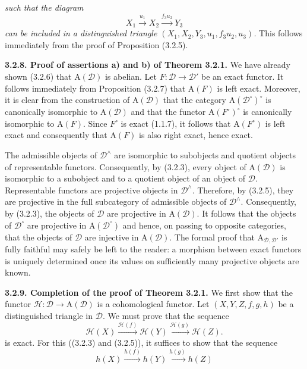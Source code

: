 \clearpage
{}%
\begingroup\small\setlength{\parskip}{0pt}\setlength{\emergencystretch}{1.5em}
\noindent\textit{such that the diagram}
\[
X_1\xrightarrow{u_1}X_2\xrightarrow{f_3u_2}Y_3
\]
\textit{can be included in a distinguished triangle
$(X_1,X_2,Y_3,u_1,f_3u_2,u_3)$.}
This follows immediately from the proof of Proposition (3.2.5).

\medskip\noindent\textbf{3.2.8. Proof of assertions a) and b) of Theorem
3.2.1.}\quad
We have already shown (3.2.6) that $\mathrm A(\mathcal D)$ is abelian. Let
$F\colon\mathcal D\to\mathcal D'$ be an exact functor. It follows
immediately from Proposition (3.2.7) that $\mathrm A(F)$ is left exact.
Moreover, it is clear from the construction of $\mathrm A(\mathcal D)$ that
the category $\mathrm A(\mathcal D^\circ)^\circ$ is canonically isomorphic
to $\mathrm A(\mathcal D)$ and that the functor
$\mathrm A(F^\circ)^\circ$ is canonically isomorphic to $\mathrm A(F)$.
Since $F^\circ$ is exact (1.1.7), it follows that
$\mathrm A(F^\circ)$ is left exact and consequently that $\mathrm A(F)$ is
also right exact, hence exact.

The admissible objects of $\mathcal D^\wedge$ are isomorphic to subobjects
and quotient objects of representable functors. Consequently, by (3.2.3),
every object of $\mathrm A(\mathcal D)$ is isomorphic to a subobject and to
a quotient object of an object of $\mathcal D$. Representable functors are
projective objects in $\mathcal D^\wedge$. Therefore, by (3.2.5), they are
projective in the full subcategory of admissible objects of
$\mathcal D^\wedge$. Consequently, by (3.2.3), the objects of $\mathcal D$
are projective in $\mathrm A(\mathcal D)$. It follows that the objects of
$\mathcal D^\circ$ are projective in $\mathrm A(\mathcal D^\circ)$ and
hence, on passing to opposite categories, that the objects of $\mathcal D$
are injective in $\mathrm A(\mathcal D)$. The formal proof that
$\mathrm A_{\mathcal D,\mathcal D'}$ is fully faithful may safely be left to
the reader: a morphism between exact functors is uniquely determined once
its values on sufficiently many projective objects are known.

\medskip\noindent\textbf{3.2.9. Completion of the proof of Theorem 3.2.1.}
We first show that the functor
$\mathcal H\colon\mathcal D\to\mathrm A(\mathcal D)$ is a cohomological
functor. Let $(X,Y,Z,f,g,h)$ be a distinguished triangle in $\mathcal D$.
We must prove that the sequence
\[
\mathcal H(X)\xrightarrow{\mathcal H(f)}\mathcal H(Y)
\xrightarrow{\mathcal H(g)}\mathcal H(Z).
\]
is exact. For this ((3.2.3) and (3.2.5)), it suffices to show that the sequence
\[
h(X)\xrightarrow{h(f)}h(Y)\xrightarrow{h(g)}h(Z)
\tag{3.2.9.1}
\]
\endgroup
